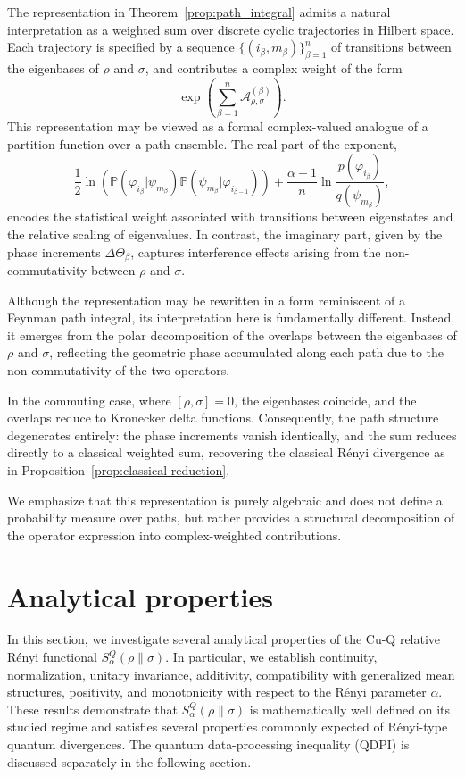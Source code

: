 \documentclass[a4paper, amsfonts, amssymb, amsmath, reprint, showkeys, nofootinbib, twoside, aps, pra]{revtex4-2}
\theoremstyle{definition}
\begin{document}
The representation in Theorem~\ref{prop:path_integral} 
admits a natural interpretation as a weighted sum over discrete cyclic trajectories in Hilbert space. Each trajectory is specified by a sequence 
$\{(i_\beta, m_\beta)\}_{\beta=1}^n$ of transitions 
between the eigenbases of $\rho$ and $\sigma$, and 
contributes a complex weight of the form
\[
\exp\left(\sum_{\beta=1}^n \mathcal{A}_{\rho,\sigma}^{(\beta)}\right).
\]
This representation may be viewed as a formal complex-valued analogue of a partition function over a path ensemble. The real part of the exponent,
\[
\frac{1}{2}\ln\!\left(
\mathbb{P}(\varphi_{i_\beta}|\psi_{m_\beta})
\mathbb{P}(\psi_{m_\beta}|\varphi_{i_{\beta-1}})
\right)
+
\frac{\alpha-1}{n}
\ln\frac{p(\varphi_{i_\beta})}{q(\psi_{m_\beta})},
\]
encodes the statistical weight associated with transitions between eigenstates and the relative scaling of eigenvalues. In contrast, the imaginary part, given by the phase increments $\Delta\Theta_\beta$, captures interference 
effects arising from the non-commutativity between 
$\rho$ and $\sigma$.

Although the representation may be rewritten in a form reminiscent of a Feynman path integral, its interpretation here is fundamentally different. Instead, it emerges from the polar decomposition of 
the overlaps between the eigenbases of $\rho$ and 
$\sigma$, reflecting the geometric phase accumulated along each path due to the non-commutativity of the 
two operators.

In the commuting case, where $[\rho,\sigma]=0$, the eigenbases coincide, and the overlaps reduce to Kronecker delta functions. Consequently, the path structure degenerates entirely: the phase increments vanish identically, and the sum reduces directly to a classical weighted sum, recovering the classical Rényi divergence as in Proposition~\ref{prop:classical-reduction}.

We emphasize that this representation is purely algebraic and does not define a probability measure over paths, but rather provides a structural decomposition of the operator expression into complex-weighted contributions.



\section{{Analytical properties}\label{Analytical property}}

In this section, we investigate several analytical properties of the Cu-Q relative Rényi functional \(S_\alpha^Q(\rho\|\sigma)\).
In particular, we establish continuity, normalization, unitary invariance, additivity, compatibility with generalized mean structures, positivity, and monotonicity with respect to the Rényi parameter \(\alpha\).
These results demonstrate that \(S_\alpha^Q(\rho\|\sigma)\) is mathematically well defined on its studied regime and satisfies several properties commonly expected of Rényi-type quantum divergences.
The quantum data-processing inequality (QDPI) is discussed separately in the following section.
\end{document}
